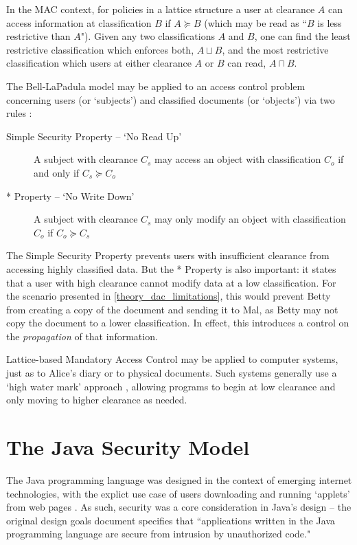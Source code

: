 In the MAC context, for policies in a lattice structure a user at clearance $ A $ can access information at classification $ B $ if $ A \succeq B $ (which may be read as ``$ B $ is less restrictive than $ A $"). Given any two classifications $ A $ and $ B $, one can find the least restrictive classification which enforces both, $ A \sqcup B $, and the most restrictive classification which users at either clearance $ A $ or $ B $ can read, $ A \sqcap B $.

\clearpage

The Bell-LaPadula model may be applied to an access control problem concerning users (or `subjects') and classified documents (or `objects') via two rules \cite{sandhu1993lattice}:

\begin{description}
	\item[Simple Security Property -- `No Read Up'] A subject with clearance $ C_s $ may access an object with classification $ C_o $ if and only if $ C_s \succeq C_o $
	
	\item[* Property -- `No Write Down'] A subject with clearance $ C_s $ may only modify an object with classification $ C_o $ if $ C_o \succeq C_s $
\end{description}

The Simple Security Property prevents users with insufficient clearance from accessing highly classified data. But the * Property is also important: it states that a user with high clearance cannot modify data at a low classification. For the scenario presented in \ref{theory_dac_limitations}, this would prevent Betty from creating a copy of the document and sending it to Mal, as Betty may not copy the document to a lower classification. In effect, this introduces a control on the \textit{propagation} of that information.

Lattice-based Mandatory Access Control may be applied to computer systems, just as to Alice's diary or to physical documents. Such systems generally use a `high water mark' approach \cite{jones1975highwatermark}, allowing programs to begin at low clearance and only moving to higher clearance as needed.

\section{The Java Security Model} \label{theory_javasec}

The Java programming language was designed in the context of emerging internet technologies, with the explict use case of users downloading and running `applets' from web pages \cite{gong1999javasecspec}. As such, security was a core consideration in Java's design -- the original design goals document \cite{javadesignprinciples} specifies that ``applications written in the Java programming language are secure from intrusion by unauthorized code."
 
